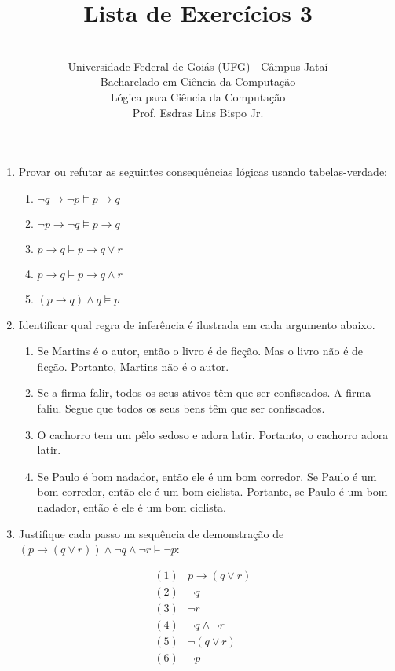 \documentclass[12pt,a4paper,oneside]{article}
\author{\\Universidade Federal de Goiás (UFG) - Câmpus Jataí\\Bacharelado em Ciência da Computação \\Lógica para Ciência da Computação \\Prof. Esdras Lins Bispo Jr.}
\title{\sc \huge Lista de Exercícios 3}
\begin{document}
\maketitle

\begin{enumerate}

	\item Provar ou refutar as seguintes consequências lógicas usando tabelas-verdade:

		\begin{enumerate}
			\item $\neg q \rightarrow \neg p \models p \rightarrow q $
			\item $\neg p \rightarrow \neg q \models p \rightarrow q$
			\item $p \rightarrow q \models p \rightarrow q \vee r$
			\item $p \rightarrow q \models p \rightarrow q \wedge r$
			\item $(p \rightarrow q) \wedge q \models p$
		\end{enumerate}
	
	\item Identificar qual regra de inferência é ilustrada em cada argumento abaixo.
		\begin{enumerate}
			\item Se Martins é o autor, então o livro é de ficção. Mas o livro não é de ficção. Portanto, Martins não é o autor.
			\item Se a firma falir, todos os seus ativos têm que ser confiscados. A firma faliu. Segue que todos os seus bens têm que ser confiscados.
			\item O cachorro tem um pêlo sedoso e adora latir. Portanto, o cachorro adora latir.
			\item Se Paulo é bom nadador, então ele é um bom corredor. Se Paulo é um bom corredor, então ele é um bom ciclista. Portante, se Paulo é um bom nadador, então é ele é um bom ciclista.
		\end{enumerate}
		
	\item Justifique cada passo na sequência de demonstração de $(p \rightarrow (q \vee r)) \wedge \neg q \wedge \neg r \models \neg p$:
	
		\begin{eqnarray*}
			(1) & p \rightarrow (q \vee r) & \\
			(2) & \neg q & \\
			(3) & \neg r & \\
			(4) & \neg q \wedge \neg r & \\
			(5) & \neg (q \vee r) & \\
			(6) & \neg p & 
		\end{eqnarray*}
		

\end{enumerate}
\end{document}
